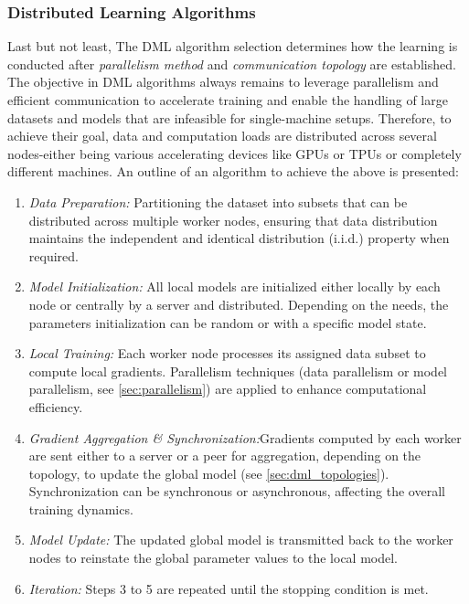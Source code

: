 \subsubsection{Distributed Learning Algorithms}
Last but not least, The DML algorithm selection determines how the learning is conducted after \textit{parallelism method} and \textit{communication topology} are
established. The objective in DML algorithms always remains to leverage parallelism and efficient communication to accelerate training and enable the handling of
large datasets and models that are infeasible for single-machine setups. Therefore, to achieve their goal, data and computation loads are distributed across several
nodes-either being various accelerating devices like GPUs or TPUs or completely different machines\cite{teerapittayanonDistributedDeepNeural2017}.
An outline of an algorithm to achieve the above is presented:

\begin{enumerate}
    \item \emph{Data Preparation:} Partitioning the dataset into subsets that can be distributed across multiple worker nodes,
          ensuring that data distribution maintains the independent and identical distribution (i.i.d.) property when required.
    \item \emph{Model Initialization:} All local models are initialized either locally by each node or centrally by a server and distributed.
          Depending on the needs, the parameters initialization can be random or with a specific model state.
    \item \emph{Local Training:} Each worker node processes its assigned data subset to compute local gradients.
          Parallelism techniques (data parallelism or model parallelism, see \cref{sec:parallelism}) are applied to enhance computational efficiency.
    \item \emph{Gradient Aggregation \& Synchronization:}Gradients computed by each worker are sent either to a server or a peer for aggregation, depending on the topology,
          to update the global model (see \cref{sec:dml_topologies}). Synchronization can be synchronous or asynchronous, affecting the overall training dynamics.
    \item \emph{Model Update:} The updated global model is transmitted back to the worker nodes to reinstate the global
          parameter values to the local model.
    \item \emph{Iteration:} Steps 3 to 5 are repeated until the stopping condition is met.
\end{enumerate}

